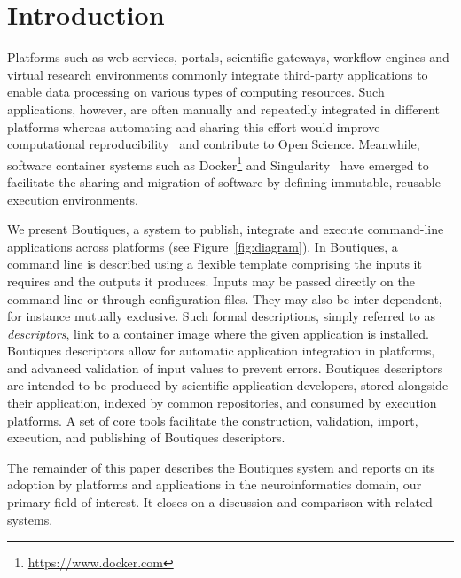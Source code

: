 \documentclass[a4paper,num-refs]{oup-contemporary}
\newcommand{\boutiques}{Boutiques\xspace}
\begin{document}
\section{Introduction}

Platforms such as web services, portals, scientific gateways, workflow
engines and virtual research environments commonly integrate
third-party applications to enable data processing on various types of
computing resources. Such applications, however, are often manually
and repeatedly integrated in different platforms whereas automating
and sharing this effort would improve computational
reproducibility~\cite{peng2011reproducible,Stodden1240} and contribute to Open
Science. Meanwhile, software container systems such as
Docker\footnote{\url{https://www.docker.com}} and
Singularity~\cite{kurtzer2017singularity} have emerged to facilitate
the sharing and migration of software by defining immutable, reusable
execution environments.

We present \boutiques, a system to publish, integrate and execute
command-line applications across platforms (see
Figure~\ref{fig:diagram}).  In \boutiques, a command line is described
using a flexible template comprising the inputs it requires and the
outputs it produces. Inputs may be passed directly on the command line
or through configuration files. They may also be inter-dependent, for
instance mutually exclusive. Such formal descriptions, simply referred
to as \emph{descriptors}, link to a container image where the given
application is installed. \boutiques descriptors allow for automatic
application integration in platforms, and advanced validation of input
values to prevent errors.  \boutiques descriptors are intended to be
produced by scientific application developers, stored alongside their
application, indexed by common repositories, and consumed by execution
platforms.  A set of core tools facilitate the construction,
validation, import, execution, and publishing of \boutiques
descriptors.

The remainder of this paper describes the \boutiques system
and reports on its adoption by platforms
and applications in the neuroinformatics domain, our primary field of
interest. It closes on a discussion and
comparison with related systems.
\end{document}
